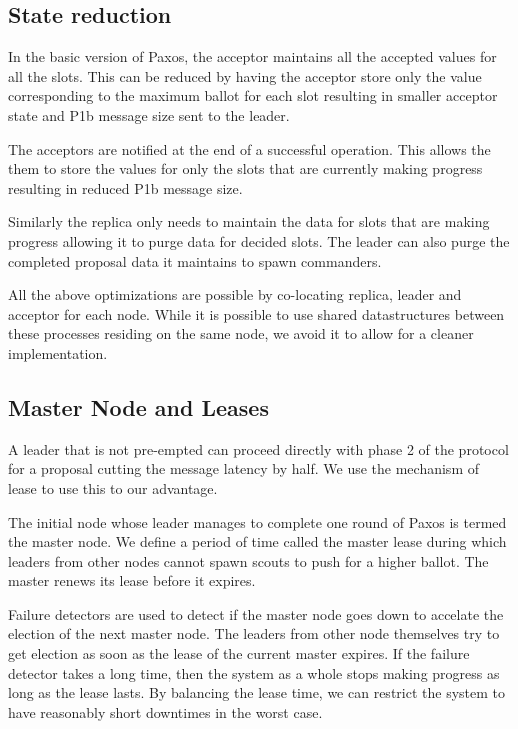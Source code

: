 \subsection{State reduction}

In the basic version of Paxos, the acceptor maintains all the accepted values
for all the slots. This can be reduced by having the acceptor store only the
value corresponding to the maximum ballot for each slot resulting in smaller
acceptor state and P1b message size sent to the leader.

The acceptors are notified at the end of a successful operation. This allows
the them to store the values for only the slots that are currently making
progress resulting in reduced P1b message size.

Similarly the replica only needs to maintain the data for slots that are
making progress allowing it to purge data for decided slots. The leader can
also purge the completed proposal data it maintains to spawn commanders.

All the above optimizations are possible by co-locating replica, leader
and acceptor for each node. While it is possible to use shared datastructures
between these processes residing on the same node, we avoid it to allow for
a cleaner implementation.

\subsection{Master Node and Leases}
\label{section:a.n.d.lease}

A leader that is not pre-empted can proceed directly with phase 2 of the
protocol for a proposal cutting the message latency by half. We use the
mechanism of lease to use this to our advantage.

The initial node whose leader manages to complete one round of Paxos is
termed the master node. We define a period of time called the master lease
during which leaders from other nodes cannot spawn scouts to push for a
higher ballot. The master renews its lease before it expires.

Failure detectors%
are used to detect if the master node goes down to accelate the election
of the next master node. The leaders from other node themselves try to
get election as soon as the lease of the current master expires. If the
failure detector takes a long time, then the system as a whole
stops making progress as long as the lease lasts. By balancing the lease
time, we can restrict the system to have reasonably short downtimes in
the worst case.

